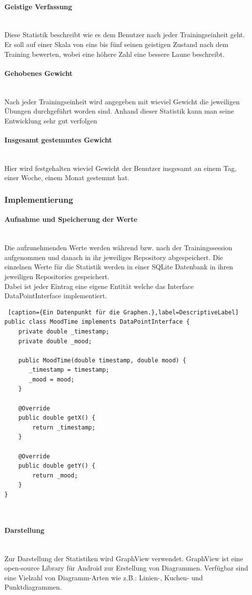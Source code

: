 \documentclass[FIPLY_base.tex]{subfiles}
\begin{document}
\paragraph{Geistige Verfassung}\ \\
Diese Statistik beschreibt wie es dem Benutzer nach jeder Trainingseinheit geht.
Er soll auf einer Skala von eins bis fünf seinen geistigen Zustand nach dem Training bewerten, wobei eine höhere Zahl eine bessere Laune beschreibt.
\paragraph{Gehobenes Gewicht}\ \\
Nach jeder Trainingseinheit wird angegeben mit wieviel Gewicht die jeweiligen Übungen durchgeführt worden sind.
Anhand dieser Statistik kann man seine Entwicklung sehr gut verfolgen
\paragraph{Insgesamt gestemmtes Gewicht}\ \\
Hier wird festgehalten wieviel Gewicht der Benutzer insgesamt an einem Tag, einer Woche, einem Monat gestemmt hat.

\newpage
\subsubsection{Implementierung}
\paragraph{Aufnahme und Speicherung der Werte}\ \\
Die aufzunehmenden Werte werden während bzw. nach der Trainingssession aufgenommen und danach in ihr jeweiliges Repository abgespeichert.
Die einzelnen Werte für die Statistik werden in einer SQLite Datenbank in ihren jeweiligen Repositories gespeichert.
\ \\
Dabei ist jeder Eintrag eine eigene Entität welche das Interface DataPointInterface implementiert.

\begin{lstlisting} [caption={Ein Datenpunkt für die Graphen.},label=DescriptiveLabel]
public class MoodTime implements DataPointInterface {
    private double _timestamp;
    private double _mood;

    public MoodTime(double timestamp, double mood) {
       _timestamp = timestamp;
       _mood = mood;
    }

    @Override
    public double getX() {
        return _timestamp;
    }

    @Override
    public double getY() {
        return _mood;
    }
}
\end{lstlisting}

\ \\

\paragraph{Darstellung}\ \\
Zur Darstellung der Statistiken wird GraphView verwendet. GraphView ist eine open-source Library für Android zur Erstellung von Diagrammen.
Verfügbar sind eine Vielzahl von Diagramm-Arten wie z.B.: Linien-, Kuchen- und Punktdiagrammen.
\end{document}
